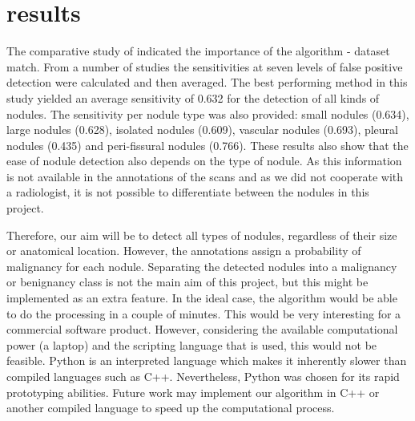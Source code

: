 \section{results}
The comparative study of \cite{ginneken} indicated the importance of the
algorithm - dataset match. From a number of studies the sensitivities at seven
levels of false positive detection were calculated and then averaged. The best
performing method in this study yielded an average sensitivity of 0.632 for the
detection of all kinds of nodules. The sensitivity per nodule type was also
provided: small nodules (0.634), large nodules (0.628), isolated nodules
(0.609), vascular nodules (0.693), pleural nodules (0.435) and peri-fissural
nodules (0.766).
These results also show that the ease of nodule detection also depends on the
type of nodule. As this information is not available in the annotations of the
scans and as we did not cooperate with a radiologist, it is not possible to
differentiate between the nodules in this project.

Therefore, our aim will be to
detect all types of nodules, regardless of their size or anatomical location.
However, the annotations assign a probability of malignancy for each nodule.
Separating the detected nodules into a malignancy or benignancy class is not the
main aim of this project, but this might be implemented as an extra feature.
In the ideal case, the algorithm would be able to do the processing in a couple
of minutes. This would be very interesting for a commercial software product.
However, considering the available computational power (a laptop) and the
scripting language that is used, this would not be feasible. Python is an
interpreted language which makes it inherently slower than compiled languages
such as C++. Nevertheless, Python was chosen for its rapid prototyping
abilities. Future work may implement our algorithm in C++ or another compiled
language to speed up the computational process.
